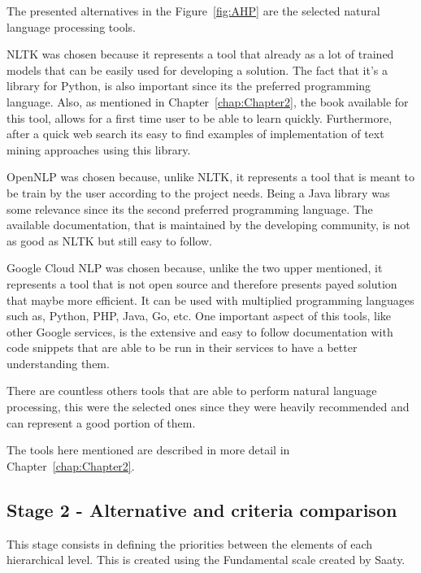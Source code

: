 The presented alternatives in the Figure~\ref{fig:AHP} are the selected natural language processing tools.

NLTK was chosen because it represents a tool that already as a lot of trained models that can be easily used for developing a solution.
The fact that  it's a library for Python, is also important since its the preferred programming language.
Also, as mentioned in Chapter~\ref{chap:Chapter2}, the book available for this tool, allows for a first time user to be able to learn quickly.
Furthermore, after a quick web search its easy to find examples of implementation of text mining approaches using this library.

OpenNLP was chosen because, unlike NLTK, it represents a tool that is meant to be train by the user according to the project needs.
Being a Java library was some relevance since its the second preferred programming language.
The available documentation, that is maintained by the developing community, is not as good as NLTK but still easy to follow.

Google Cloud NLP was chosen because, unlike the two upper mentioned, it represents a tool that is not open source and therefore presents payed solution that maybe more efficient.
It can be used with multiplied programming languages such as, Python, PHP, Java, Go, etc.
One important aspect of this tools, like other Google services, is the extensive and easy to follow documentation with code snippets that are able to be run in their services to have a better understanding them.

There are countless others tools that are able to perform natural language processing, this were the selected ones since they were heavily recommended and can represent a good portion of them.

The tools here mentioned are described in more detail in Chapter~\ref{chap:Chapter2}.

\subsection{Stage 2 - Alternative and criteria comparison}

This stage consists in defining the priorities between the elements of each hierarchical level.
This is created using the Fundamental scale created by Saaty\cite{saaty1987analytic}.

